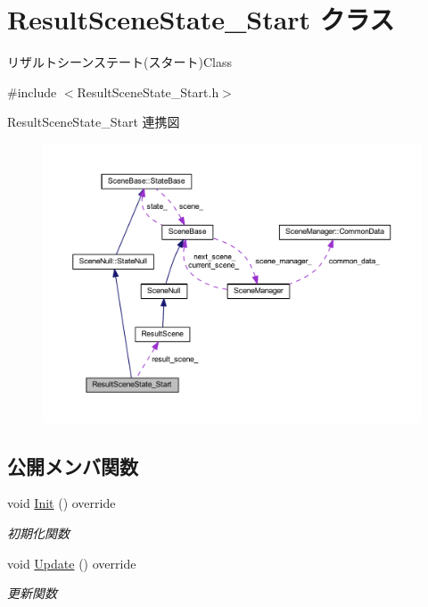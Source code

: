 \hypertarget{class_result_scene_state___start}{}\section{Result\+Scene\+State\+\_\+\+Start クラス}
\label{class_result_scene_state___start}


リザルトシーンステート(スタート)Class  




{\ttfamily \#include $<$Result\+Scene\+State\+\_\+\+Start.\+h$>$}



Result\+Scene\+State\+\_\+\+Start 連携図\nopagebreak
\begin{figure}[H]
\begin{center}
\leavevmode
\includegraphics[width=350pt]{class_result_scene_state___start__coll__graph}
\end{center}
\end{figure}
\subsection*{公開メンバ関数}
\begin{DoxyCompactItemize}
\item 
void \mbox{\hyperlink{class_result_scene_state___start_a615c7e05efd2320b8956c5fd94398f55}{Init}} () override
\begin{DoxyCompactList}\small\item\em 初期化関数 \end{DoxyCompactList}\item 
void \mbox{\hyperlink{class_result_scene_state___start_a2ecdef2bef0cd1a04055e8687e11199b}{Update}} () override
\begin{DoxyCompactList}\small\item\em 更新関数 \end{DoxyCompactList}\end{DoxyCompactItemize}
